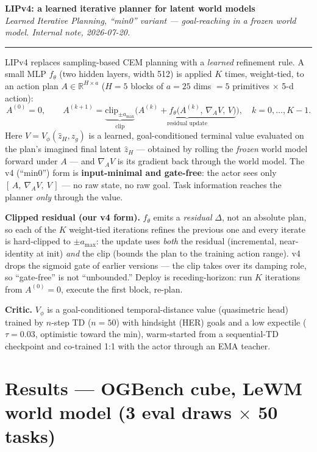 \documentclass[11pt]{article}
\begin{document}
{\LARGE\bfseries LIPv4: a learned iterative planner for latent world models}\\[2pt]
{\small\itshape Learned Iterative Planning, ``min0'' variant --- goal-reaching in a frozen world model. Internal note, 2026-07-20.}

\vspace{2pt}
\hrule
\vspace{4pt}

LIPv4 replaces sampling-based CEM planning with a \emph{learned} refinement rule. A small MLP $f_\theta$ (two hidden layers, width 512) is applied $K$ times, weight-tied, to an action plan $A\in\mathbb{R}^{H\times a}$ ($H{=}5$ blocks of $a{=}25$ dims $=5$ primitives $\times$ 5-d action):
\[
A^{(0)}=0,\qquad
A^{(k{+}1)}=\underbrace{\mathrm{clip}_{\pm a_{\max}}}_{\text{clip}}\!\Big(\underbrace{A^{(k)}+f_\theta\big(A^{(k)},\,\nabla_{\!A}V,\,V\big)}_{\text{residual update}}\Big),\quad k=0,\dots,K{-}1 .
\]
Here $V=V_\phi(\hat z_H, z_g)$ is a learned, goal-conditioned terminal value evaluated on the plan's imagined final latent $\hat z_H$ --- obtained by rolling the \emph{frozen} world model forward under $A$ --- and $\nabla_{\!A}V$ is its gradient back through the world model. The v4 (``min0'') form is \textbf{input-minimal and gate-free}: the actor sees only $[\,A,\ \nabla_{\!A}V,\ V\,]$ --- no raw state, no raw goal. Task information reaches the planner \emph{only} through the value.

\textbf{Clipped residual (our v4 form).} $f_\theta$ emits a \emph{residual} $\Delta$, not an absolute plan, so each of the $K$ weight-tied iterations refines the previous one and every iterate is hard-clipped to $\pm a_{\max}$: the update uses \emph{both} the residual (incremental, near-identity at init) \emph{and} the clip (bounds the plan to the training action range). v4 drops the sigmoid gate of earlier versions --- the clip takes over its damping role, so ``gate-free'' is not ``unbounded.'' Deploy is receding-horizon: run $K$ iterations from $A^{(0)}{=}0$, execute the first block, re-plan.

\textbf{Critic.} $V_\phi$ is a goal-conditioned temporal-distance value (quasimetric head) trained by $n$-step TD ($n{=}50$) with hindsight (HER) goals and a low expectile ($\tau{=}0.03$, optimistic toward the min), warm-started from a sequential-TD checkpoint and co-trained 1:1 with the actor through an EMA teacher.

\section*{Results --- OGBench cube, LeWM world model (3 eval draws $\times$ 50 tasks)}
\end{document}
